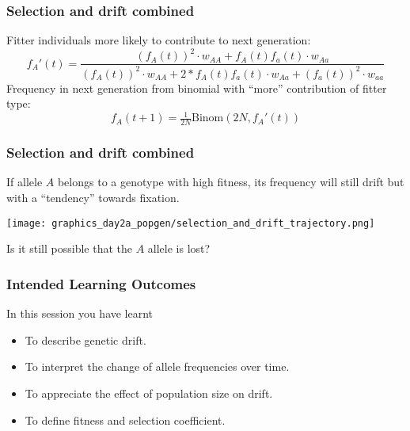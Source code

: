 \documentclass{beamer}
\newcommand{\1}{\ensuremath{\mathbf{1}}}
\begin{document}
%
%
%
\begin{frame}\frametitle{Selection and drift combined}
	Fitter individuals more likely to contribute to next generation:
	\begin{equation}
		f_A'(t) = \frac{(f_A(t))^2 \cdot w_{AA} + f_A(t)f_a(t) \cdot w_{Aa}}{(f_A(t))^2 \cdot w_{AA} + 2 * f_A(t)f_a(t) \cdot w_{Aa} + (f_a(t))^2 \cdot w_{aa}}
	\end{equation}
	Frequency in next generation from binomial with ``more'' contribution of fitter type:
	\begin{equation}
		f_A(t+1) = \tfrac{1}{2N} \text{Binom}(2N, f_A'(t))
	\end{equation}
\end{frame}
%
%
%
\begin{frame}\frametitle{Selection and drift combined}
	If allele $A$ belongs to a genotype with high fitness, its frequency will still drift but with a ``tendency'' towards fixation.
	\begin{center}
		\texttt{[image: graphics\_day2a\_popgen/selection\_and\_drift\_trajectory.png]}
	\end{center}
	Is it still possible that the $A$ allele is lost?
\end{frame}
%
%
%
\begin{frame}\frametitle{Intended Learning Outcomes}
	In this session you have learnt
	\begin{itemize}
		\item To describe genetic drift.
		\item To interpret the change of allele frequencies over time.
		\item To appreciate the effect of population size on drift.
		\item To define fitness and selection coefficient.
	\end{itemize}
\end{frame}
%
%
%
\end{document}
